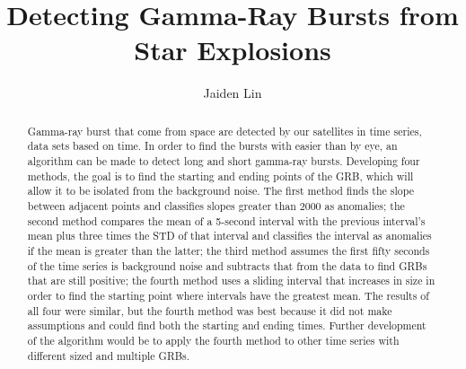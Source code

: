 \documentclass[final,5p,times,twocolumn,authoryear]{elsarticle}
\begin{document}
\begin{frontmatter}



\title{Detecting Gamma-Ray Bursts from Star Explosions}


\author[first]{Jaiden Lin}

\begin{abstract}
Gamma-ray burst that come from space are detected by our satellites in time series, data sets based on time. In order to find the bursts with easier than by eye, an algorithm can be made to detect long and short gamma-ray bursts. Developing four methods, the goal is to find the starting and ending points of the GRB, which will allow it to be isolated from the background noise. The first method finds the slope between adjacent points and classifies slopes greater than 2000 as anomalies; the second method compares the mean of a 5-second interval with the previous interval's mean plus three times the STD of that interval and classifies the interval as anomalies if the mean is greater than the latter; the third method assumes the first fifty seconds of the time series is background noise and subtracts that from the data to find GRBs that are still positive; the fourth method uses a sliding interval that increases in size in order to find the starting point where intervals have the greatest mean. The results of all four were similar, but the fourth method was best because it did not make assumptions and could find both the starting and ending times. Further development of the algorithm would be to apply the fourth method to other time series with different sized and multiple GRBs.
\end{abstract}


\end{frontmatter}
\end{document}
